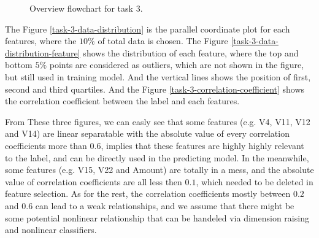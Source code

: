 \documentclass[11pt]{article}
\begin{document}
\begin{figure}[H]
  \centering
  \caption{Overview flowchart for task 3.}
  \label{task-3-overview-flowchart}
\end{figure}

The Figure \ref{task-3-data-distribution} is the parallel coordinate plot for each features, where the $10\%$ of total data is chosen. The Figure \ref{task-3-data-distribution-feature} shows the distribution of each feature, where the top and bottom $5\%$ points are considered as outliers, which are not shown in the figure, but still used in training model. And the vertical lines shows the position of first, second and third quartiles. And the Figure \ref{task-3-correlation-coefficient} shows the correlation coefficient between the label and each features.

From These three figures, we can easly see that some features (e.g. V4, V11, V12 and V14) are linear separatable with the absolute value of every correlation coefficients more than $0.6$, implies that these features are highly highly relevant to the label, and can be directly used in the predicting model. In the meanwhile, some features (e.g. V15, V22 and Amount) are totally in a mess, and the absolute value of correlation coefficients are all less then $0.1$, which needed to be deleted in feature selection. As for the rest, the correlation coefficients mostly between $0.2$ and $0.6$ can lead to a weak relationships, and we assume that there might be some potential nonlinear relationship that can be handeled via dimension raising and nonlinear classifiers.
\end{document}
